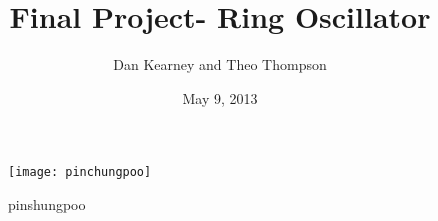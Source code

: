 \documentclass{article}
\title{Final Project- Ring Oscillator}
\author{Dan Kearney and Theo Thompson}
\date{May 9, 2013}
\begin{document}
\maketitle


\begin{figure}[H]
\centering
\texttt{[image: pinchungpoo]}
\caption{pinshungpoo}
\label{schem}
\end{figure}
\end{document}

